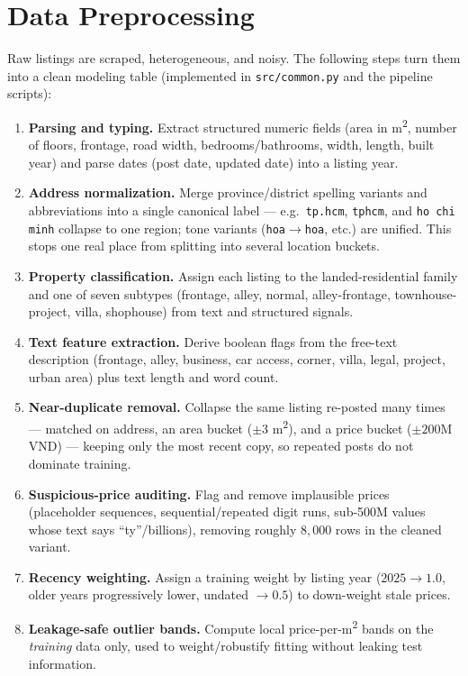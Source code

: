 \documentclass[11pt]{article}
\begin{document}
\section{Data Preprocessing}
Raw listings are scraped, heterogeneous, and noisy. The following steps turn them into a clean
modeling table (implemented in \texttt{src/common.py} and the pipeline scripts):

\begin{enumerate}
  \item \textbf{Parsing and typing.} Extract structured numeric fields (area in m\textsuperscript{2},
        number of floors, frontage, road width, bedrooms/bathrooms, width, length, built year) and
        parse dates (post date, updated date) into a listing year.
  \item \textbf{Address normalization.} Merge province/district spelling variants and abbreviations
        into a single canonical label --- e.g.\ \texttt{tp.hcm}, \texttt{tphcm}, and
        \texttt{ho chi minh} collapse to one region; tone variants (\texttt{hoa}$\rightarrow$\texttt{hoa},
        etc.) are unified. This stops one real place from splitting into several location buckets.
  \item \textbf{Property classification.} Assign each listing to the landed-residential family and
        one of seven subtypes (frontage, alley, normal, alley-frontage, townhouse-project, villa,
        shophouse) from text and structured signals.
  \item \textbf{Text feature extraction.} Derive boolean flags from the free-text description
        (frontage, alley, business, car access, corner, villa, legal, project, urban area) plus text
        length and word count.
  \item \textbf{Near-duplicate removal.} Collapse the same listing re-posted many times ---
        matched on address, an area bucket ($\pm 3$ m\textsuperscript{2}), and a price bucket
        ($\pm 200$M VND) --- keeping only the most recent copy, so repeated posts do not dominate
        training.
  \item \textbf{Suspicious-price auditing.} Flag and remove implausible prices (placeholder
        sequences, sequential/repeated digit runs, sub-500M values whose text says ``ty''/billions),
        removing roughly $8{,}000$ rows in the cleaned variant.
  \item \textbf{Recency weighting.} Assign a training weight by listing year ($2025\!\rightarrow\!1.0$,
        older years progressively lower, undated $\rightarrow 0.5$) to down-weight stale prices.
  \item \textbf{Leakage-safe outlier bands.} Compute local price-per-m\textsuperscript{2} bands on
        the \emph{training} data only, used to weight/robustify fitting without leaking test
        information.
\end{enumerate}
\end{document}

